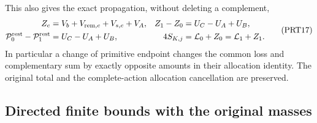 \documentclass[11pt,a4paper]{article}
\begin{document}
This also gives the exact propagation, without deleting a complement,
\[
 \begin{aligned}
 Z_e&=V_b+V_{{\rm rem},e}+V_{s,e}+V_A,
 &Z_1-Z_0&=U_C-U_A+U_B,\\
 \mathcal P^{\rm rest}_0-\mathcal P^{\rm rest}_1
    &=U_C-U_A+U_B,
 &4S_{K,j}&=\mathcal L_0+Z_0=\mathcal L_1+Z_1.
 \end{aligned}\tag{PRT17}
\]
In particular a change of primitive endpoint changes the common loss
and complementary sum by exactly opposite amounts in their allocation
identity. The original total and the complete-action allocation
cancellation are preserved.

\subsection{Directed finite bounds with the original masses}
\end{document}
